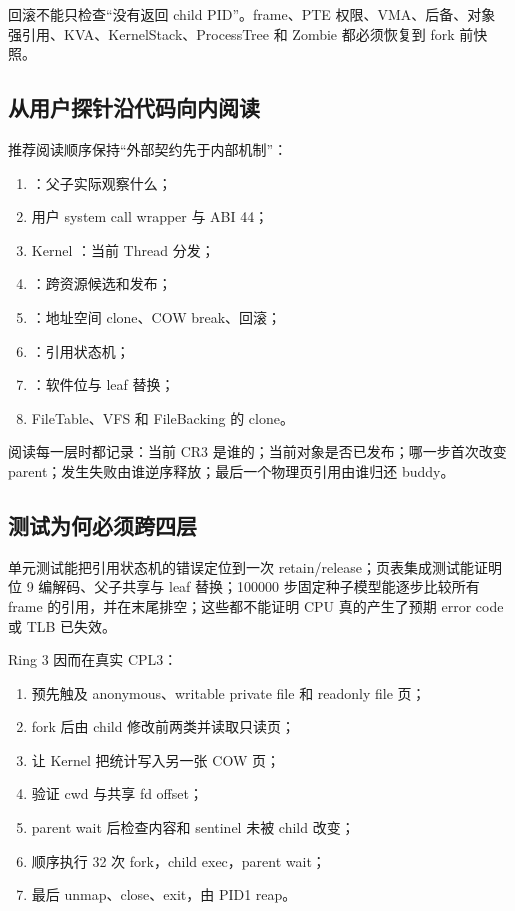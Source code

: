 回滚不能只检查“没有返回 child PID”。frame、PTE 权限、VMA、后备、对象
强引用、KVA、KernelStack、ProcessTree 和 Zombie 都必须恢复到 fork 前快照。

\subsection{从用户探针沿代码向内阅读}

推荐阅读顺序保持“外部契约先于内部机制”：

\begin{enumerate}[label=\arabic*.]
  \item {}：父子实际观察什么；
  \item 用户 system call wrapper 与 ABI 44；
  \item Kernel ：当前 Thread 分发；
  \item {}：跨资源候选和发布；
  \item {}：地址空间 clone、COW break、回滚；
  \item {}：引用状态机；
  \item {}：软件位与 leaf 替换；
  \item FileTable、VFS 和 FileBacking 的 clone。
\end{enumerate}

阅读每一层时都记录：当前 CR3 是谁的；当前对象是否已发布；哪一步首次改变
parent；发生失败由谁逆序释放；最后一个物理页引用由谁归还 buddy。

\subsection{测试为何必须跨四层}

单元测试能把引用状态机的错误定位到一次 retain/release；页表集成测试能证明
位 9 编解码、父子共享与 leaf 替换；100000 步固定种子模型能逐步比较所有
frame 的引用，并在末尾排空；这些都不能证明 CPU 真的产生了预期 error code
或 TLB 已失效。

Ring 3  因而在真实 CPL3：

\begin{enumerate}[label=\arabic*.]
  \item 预先触及 anonymous、writable private file 和 readonly file 页；
  \item fork 后由 child 修改前两类并读取只读页；
  \item 让 Kernel 把统计写入另一张 COW 页；
  \item 验证 cwd 与共享 fd offset；
  \item parent wait 后检查内容和 sentinel 未被 child 改变；
  \item 顺序执行 32 次 fork，child exec，parent wait；
  \item 最后 unmap、close、exit，由 PID1 reap。
\end{enumerate}

